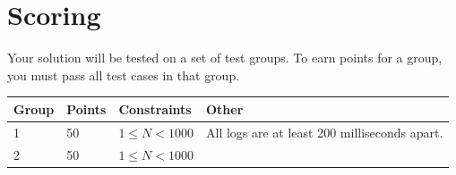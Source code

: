 \section*{Scoring}
Your solution will be tested on a set of test groups. To earn points for a group,
you must pass all test cases in that group.

\begin{tabular}{| l | l | l | l |}
\hline
Group & Points & Constraints & Other \\ \hline
1     & 50         &  $1 \le N < 1000$ & All logs are at least 200 milliseconds apart.\\ \hline
2     & 50         &  $1 \le N < 1000$ & \\ \hline
\end{tabular}
